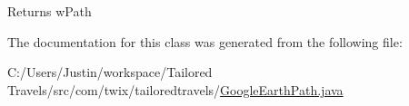 \begin{DoxyReturn}{Returns}
w\-Path 
\end{DoxyReturn}


The documentation for this class was generated from the following file\-:\begin{DoxyCompactItemize}
\item 
C\-:/\-Users/\-Justin/workspace/\-Tailored Travels/src/com/twix/tailoredtravels/\hyperlink{_google_earth_path_8java}{Google\-Earth\-Path.\-java}\end{DoxyCompactItemize}
